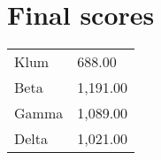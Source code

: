 \documentclass{article}
\begin{document}
\section*{Final scores}

\begin{center}
\begin{tabular}[t]{ll}
Klum & 688.00\\
Beta & 1,191.00\\
Gamma & 1,089.00\\
Delta & 1,021.00\\
\end{tabular}
\end{center}
\end{document}
